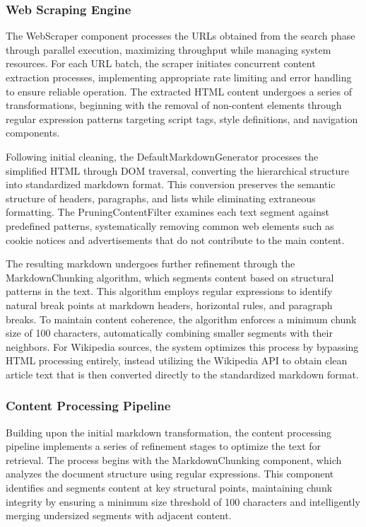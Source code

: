\documentclass[fleqn,moreauthors,10pt]{ds_report}
\begin{document}
\subsubsection*{Web Scraping Engine}
The WebScraper component processes the URLs obtained from the search phase through parallel execution, maximizing throughput while managing system resources. For each URL batch, the scraper initiates concurrent content extraction processes, implementing appropriate rate limiting and error handling to ensure reliable operation. The extracted HTML content undergoes a series of transformations, beginning with the removal of non-content elements through regular expression patterns targeting script tags, style definitions, and navigation components.

Following initial cleaning, the DefaultMarkdownGenerator processes the simplified HTML through DOM traversal, converting the hierarchical structure into standardized markdown format. This conversion preserves the semantic structure of headers, paragraphs, and lists while eliminating extraneous formatting. The PruningContentFilter examines each text segment against predefined patterns, systematically removing common web elements such as cookie notices and advertisements that do not contribute to the main content.

The resulting markdown undergoes further refinement through the MarkdownChunking algorithm, which segments content based on structural patterns in the text. This algorithm employs regular expressions to identify natural break points at markdown headers, horizontal rules, and paragraph breaks. To maintain content coherence, the algorithm enforces a minimum chunk size of 100 characters, automatically combining smaller segments with their neighbors. For Wikipedia sources, the system optimizes this process by bypassing HTML processing entirely, instead utilizing the Wikipedia API to obtain clean article text that is then converted directly to the standardized markdown format.

\subsubsection*{Content Processing Pipeline}
Building upon the initial markdown transformation, the content processing pipeline implements a series of refinement stages to optimize the text for retrieval. The process begins with the MarkdownChunking component, which analyzes the document structure using regular expressions. This component identifies and segments content at key structural points, maintaining chunk integrity by ensuring a minimum size threshold of 100 characters and intelligently merging undersized segments with adjacent content.
\end{document}
